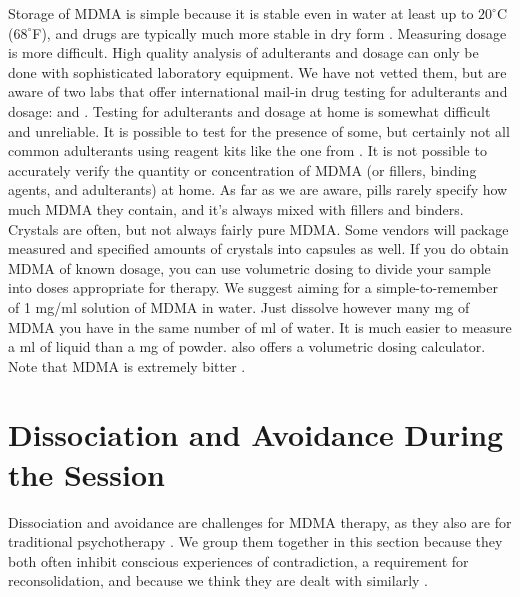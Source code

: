 \documentclass[12pt,letterpaper]{book}
\begin{document}
\label{testing}
Storage of MDMA is simple because it is stable even in water at least up to $20^{\circ}$C ($68^{\circ}$F), and drugs are typically much more stable in dry form \cite{clauwaertStability}. Measuring dosage is more difficult. High quality analysis of adulterants and dosage can only be done with sophisticated laboratory equipment. We have not vetted them, but are aware of two labs that offer international mail-in drug testing for adulterants and dosage: \textcite{kykeonTesting} and \textcite{energyTesting}. Testing for adulterants and dosage at home is somewhat difficult and unreliable. It is possible to test for the presence of some, but certainly not all common adulterants using reagent kits like the one from \textcite{danceSafeTestingKit} \cite{reagentInstructions}. It is not possible to accurately verify the quantity or concentration of MDMA (or fillers, binding agents, and adulterants) at home. As far as we are aware, pills rarely specify how much MDMA they contain, and it's always mixed with fillers and binders. Crystals are often, but not always fairly pure MDMA. Some vendors will package measured and specified amounts of crystals into capsules as well. If you do obtain MDMA of known dosage, you can use volumetric dosing to divide your sample into doses appropriate for therapy. We suggest aiming for a simple-to-remember of 1 mg/ml solution of MDMA in water. Just dissolve however many mg of MDMA you have in the same number of ml of water. It is much easier to measure a ml of liquid than a mg of powder. \textcite{volumetricDilution} also offers a volumetric dosing calculator. Note that MDMA is extremely bitter \cite{milivcevic2020bitter}.
\section{Dissociation and Avoidance During the Session}
\label{sec:dissociationandresistance}
Dissociation and avoidance are challenges for MDMA therapy, as they also are for traditional psychotherapy \cite{razviPSIP}. We group them together in this section because they both often inhibit conscious experiences of contradiction, a requirement for reconsolidation, and because we think they are dealt with similarly \cite{eckerUnlocking,kozlowskaDefenseCascade}.
\end{document}
